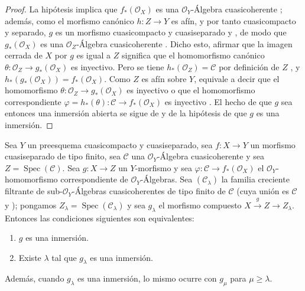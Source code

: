 \begin{proof}
La hipótesis implica que $f_*(\mathcal O_X)$ es una $\mathcal O_Y$-Álgebra cuasicoherente ; además, como el morfismo canónico $h:Z\to Y$ es afín, y por tanto cuasicompacto y separado, $g$ es un morfismo cuasicompacto y cuasiseparado  y , de modo que $g_*(\mathcal O_X)$ es una $\mathcal O_Z$-Álgebra cuasicoherente .
Dicho esto, afirmar que la imagen cerrada de $X$ por $g$ es igual a $Z$ significa  que el homomorfismo canónico $\theta:\mathcal O_Z\to g_*(\mathcal O_X)$ es inyectivo.
Pero se tiene $h_*(\mathcal O_Z)=\mathcal C$ por definición de $Z$ , y $h_*(g_*(\mathcal O_X))=f_*(\mathcal O_X)$.
Como $Z$ es afín sobre $Y$, equivale a decir que el homomorfismo $\theta:\mathcal O_Z\to g_*(\mathcal O_X)$ es inyectivo o que el homomorfismo correspondiente $\varphi=h_*(\theta):\mathcal C\to f_*(\mathcal O_X)$ es inyectivo .
El hecho de que $g$ sea entonces una inmersión abierta se sigue de  y de la hipótesis de que $g$ es una inmersión.
\end{proof}

\begin{lemma}[8.12.2]
\label{IV.8.12.2-fr}
Sea $Y$ un preesquema cuasicompacto y cuasiseparado, sea $f:X\to Y$ un morfismo cuasiseparado de tipo finito, sea $\mathcal C$ una $\mathcal O_Y$-Álgebra cuasicoherente y sea $Z=\operatorname{Spec}(\mathcal C)$.
Sea $g:X\to Z$ un $Y$-morfismo y sea $\varphi:\mathcal C\to f_*(\mathcal O_X)$ el $\mathcal O_Y$-homomorfismo correspondiente de $\mathcal O_Y$-Álgebras.
Sea $(\mathcal C_\lambda)$ la familia creciente filtrante de sub-$\mathcal O_Y$-Álgebras cuasicoherentes de tipo finito de $\mathcal C$ (cuya unión es $\mathcal C$  y \textup{)}; pongamos $Z_\lambda=\operatorname{Spec}(\mathcal C_\lambda)$ y sea $g_\lambda$ el morfismo compuesto $X\xrightarrow{g}Z\to Z_\lambda$.
Entonces las condiciones siguientes son equivalentes:
\begin{enumerate}[label=\emph{\alph*)}]
  \item $g$ es una inmersión.
  \item Existe $\lambda$ tal que $g_\lambda$ es una inmersión.
\end{enumerate}
Además, cuando $g_\lambda$ es una inmersión, lo mismo ocurre con $g_\mu$ para $\mu\geq\lambda$.

\end{lemma}

